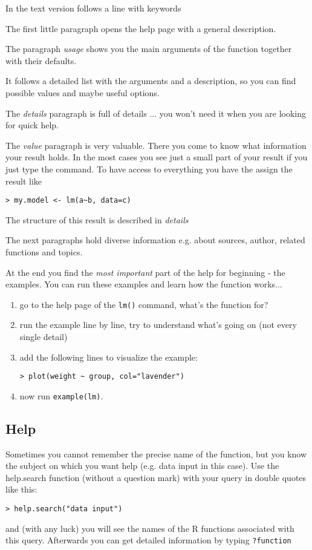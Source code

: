 \documentclass[12pt]{article}
\begin{document}
In the text version follows a line with keywords

The first little paragraph opens the help page with a general description. 

The paragraph \emph{usage} shows you the main arguments of the function together with their defaults. 

It follows a detailed list with the arguments and a description, so you can find possible values and maybe useful options.

The \emph{details} paragraph is full of details ... you won't need it when you are looking for quick help.

The \emph{value} paragraph is very valuable. There you come to know what information your result holds. In the most cases you see just a small part of your result if you just type the command. To have access to everything you have the assign the result like
\begin{verbatim}
> my.model <- lm(a~b, data=c)
\end{verbatim}
The structure of this result is described in \emph{details}

The next paragraphs hold diverse information e.g. about sources, author, related functions and topics.

At the end you find the \emph{most important} part of the help for beginning - the examples. You can run these examples and learn how the function works...

\begin{enumerate}
\item go to the help page of the \texttt{lm()} command, what's the function for?
\item run the example line by line, try to understand what's going on (not every single detail)
\item add the following lines to visualize the example:
\begin{verbatim}
> plot(weight ~ group, col="lavender")
\end{verbatim}
\item now run \verb+example(lm)+.
\end{enumerate}

\subsection{Help}
Sometimes you cannot remember the precise name of the function, but you know the subject
on which you want help (e.g. data input in this case). Use the help.search function (without
a question mark) with your query in double quotes like this:
\begin{verbatim}
> help.search("data input")
\end{verbatim}
and (with any luck) you will see the names of the R functions associated with this query. Afterwards you can get detailed information by typing \verb+?function+
\end{document}
